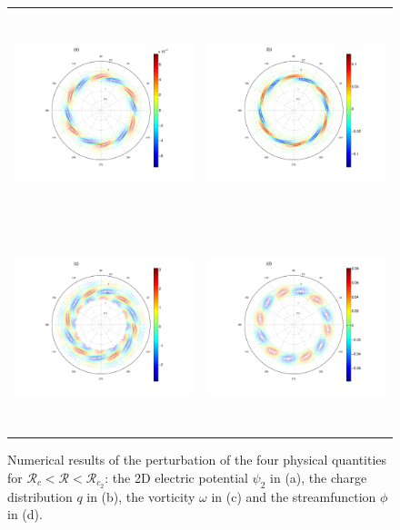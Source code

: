 \begin{figure}
\begin{tabular}{ll}
{\includegraphics[height = 6cm, keepaspectratio]{./figures/Pictures/pot_ele}}&
{\includegraphics[height = 6cm, keepaspectratio]{./figures/Pictures/charge_dens}}\\
{\includegraphics[height = 6cm, keepaspectratio]{./figures/Pictures/vorticity}}&
{\includegraphics[height = 6cm, keepaspectratio]{./figures/Pictures/stream_fun}}\\
\end{tabular}
\caption{Numerical results of the perturbation of the four physical quantities for $\mathcal{R}_c<\mathcal{R}<\mathcal{R}_{c_2}$: the 2D electric potential $\psi_2$ in (a), the charge distribution $q$ in (b), the vorticity $\omega$ in (c) and the streamfunction $\phi$ in (d).   }
\label{phy_quan_rot_waves}
\end{figure}

